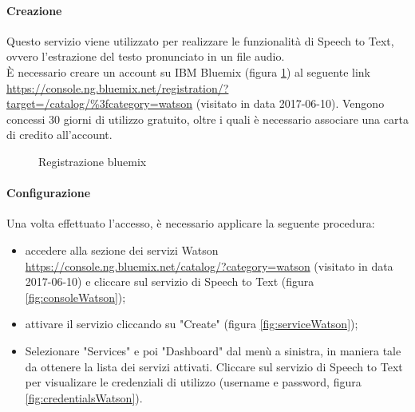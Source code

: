 \paragraph{Creazione}
Questo servizio viene utilizzato per realizzare le funzionalità di Speech to Text, ovvero l'estrazione del testo pronunciato in un file audio.\\
È necessario creare un account su IBM Bluemix (figura \ref{fig:bluemix}) al seguente link \url{https://console.ng.bluemix.net/registration/?target=/catalog/\%3fcategory=watson} (visitato in data 2017-06-10). Vengono concessi 30 giorni di utilizzo gratuito, oltre i quali è necessario associare una carta di credito all'account.
\begin{figure}[H]
	\caption{Registrazione bluemix}\label{fig:bluemix}
\end{figure}
\paragraph{Configurazione}
Una volta effettuato l'accesso, è necessario applicare la seguente procedura:
\begin{itemize}
	\item accedere alla sezione dei servizi Watson \url{https://console.ng.bluemix.net/catalog/?category=watson} (visitato in data 2017-06-10) e cliccare sul servizio di Speech to Text (figura \ref{fig:consoleWatson});
	\item attivare il servizio cliccando su "Create" (figura \ref{fig:serviceWatson});
	\item Selezionare "Services" e poi "Dashboard" dal menù a sinistra, in maniera tale da ottenere la lista dei servizi attivati. Cliccare sul servizio di Speech to Text per visualizare le credenziali di utilizzo (username e password, figura \ref{fig:credentialsWatson}).
\end{itemize}

